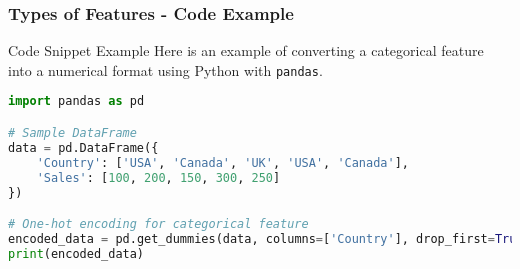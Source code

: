 \documentclass[aspectratio=169]{beamer}
\begin{document}
\begin{frame}[fragile]
    \frametitle{Types of Features - Code Example}
    \begin{block}{Code Snippet Example}
    Here is an example of converting a categorical feature into a numerical format using Python with \texttt{pandas}.
    \begin{lstlisting}[language=Python]
import pandas as pd

# Sample DataFrame
data = pd.DataFrame({
    'Country': ['USA', 'Canada', 'UK', 'USA', 'Canada'],
    'Sales': [100, 200, 150, 300, 250]
})

# One-hot encoding for categorical feature
encoded_data = pd.get_dummies(data, columns=['Country'], drop_first=True)
print(encoded_data)
    \end{lstlisting}
    \end{block}
\end{frame}
\end{document}
